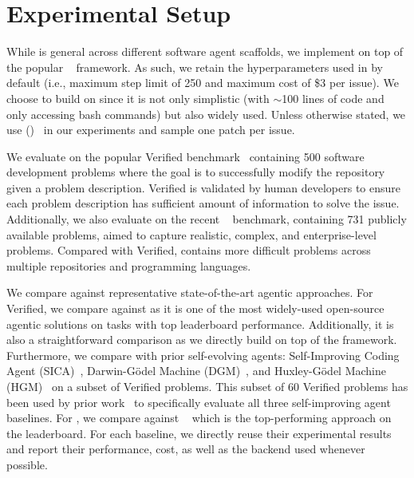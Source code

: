 \section{Experimental Setup}
\label{sec:setup}

While \tech is general across different software agent scaffolds, we implement \tech on top of the popular \minisweagent~\citep{yang2024sweagent} framework. 
As such, we retain the hyperparameters used in \minisweagent by default (i.e., maximum step limit of 250 and maximum cost of \$3 per issue).
We choose \minisweagent to build on since it is not only simplistic (with $\sim$100 lines of code and only accessing bash commands) but also widely used.
Unless otherwise stated, we use \claudesonnetfourfive ()~\citep{sonnet4.5} in our experiments and sample one patch per issue.


We evaluate \tech on the popular \swebench Verified benchmark~\citep{sbv} containing 500 software development problems where the goal is to successfully modify the repository given a problem description. 
\swebench Verified is validated by human developers to ensure each problem description has sufficient amount of information to solve the issue.
Additionally, we also evaluate on the recent \swebenchpro~\citep{deng2025swe} benchmark, containing 731 publicly available problems, aimed to capture realistic, complex, and enterprise-level problems. 
Compared with \swebench Verified, \swebenchpro contains more difficult problems across multiple repositories and programming languages.

We compare \tech against representative state-of-the-art agentic approaches. 
For \swebench Verified, we compare against \minisweagent as it is one of the most widely-used open-source agentic solutions on \swebench tasks with top leaderboard performance.
Additionally, it is also a straightforward comparison as we directly build on top of the \minisweagent framework.
Furthermore, we compare with prior self-evolving agents: Self-Improving Coding Agent (SICA)~\citep{robeyns2025sica}, Darwin-Gödel Machine (DGM)~\citep{zhang2025darwin}, and Huxley-Gödel Machine (HGM)~\citep{wang2025huxley} on a subset of \swebench Verified problems. 
This subset of 60 \swebench Verified problems has been used by prior work~\citep{wang2025huxley} to specifically evaluate all three self-improving agent baselines.
For \swebenchpro, we compare against \sweagent~\citep{yang2024sweagent} which is the top-performing approach on the \swebenchpro leaderboard.
For each baseline, we directly reuse their experimental results and report their performance, cost, as well as the backend \llm used whenever possible.
